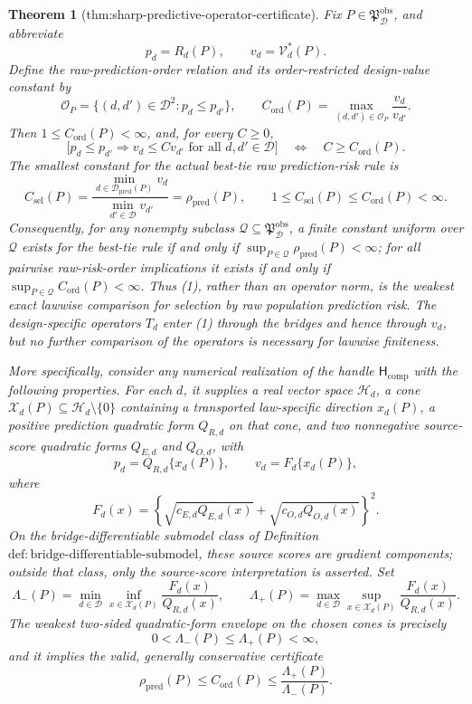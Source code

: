 \documentclass{article}
\newtheorem{theorem}{Theorem}
\begin{document}
\begin{theorem}[thm:sharp-predictive-operator-certificate]\label{thm:sharp-predictive-operator-certificate}
Fix \(P\in\mathfrak P_{\mathcal D}^{\mathrm{obs}}\), and abbreviate
\[
 p_d=R_d(P),
 \qquad v_d=\mathcal V_d^*(P).
\]
Define the raw-prediction-order relation and its order-restricted design-value constant by
\[
 \mathcal O_P=\{(d,d')\in\mathcal D^2:p_d\le p_{d'}\},
 \qquad
 C_{\mathrm{ord}}(P)=\max_{(d,d')\in\mathcal O_P}\frac{v_d}{v_{d'}}. \tag{1}
\]
Then \(1\le C_{\mathrm{ord}}(P)<\infty\), and, for every \(C\ge0\),
\[
 \bigl[p_d\le p_{d'}\Longrightarrow v_d\le C v_{d'}
 \text{ for all }d,d'\in\mathcal D\bigr]
 \quad\Longleftrightarrow\quad C\ge C_{\mathrm{ord}}(P). \tag{2}
\]
The smallest constant for the actual best-tie raw prediction-risk rule is
\[
 C_{\mathrm{sel}}(P)
 =\frac{\min_{d\in\mathcal D_{\mathrm{pred}}(P)}v_d}
 {\min_{d'\in\mathcal D}v_{d'}}
 =\rho_{\mathrm{pred}}(P),
 \qquad
 1\le C_{\mathrm{sel}}(P)\le C_{\mathrm{ord}}(P)<\infty. \tag{3}
\]
Consequently, for any nonempty subclass \(\mathcal Q\subseteq\mathfrak P_{\mathcal D}^{\mathrm{obs}}\), a finite constant uniform over \(\mathcal Q\) exists for the best-tie rule if and only if \(\sup_{P\in\mathcal Q}\rho_{\mathrm{pred}}(P)<\infty\); for all pairwise raw-risk-order implications it exists if and only if \(\sup_{P\in\mathcal Q}C_{\mathrm{ord}}(P)<\infty\). Thus (1), rather than an operator norm, is the weakest exact lawwise comparison for selection by raw population prediction risk. The design-specific operators \(T_d\) enter (1) through the bridges and hence through \(v_d\), but no further comparison of the operators is necessary for lawwise finiteness.

More specifically, consider any numerical realization of the handle \(\mathsf H_{\mathrm{comp}}\) with the following properties. For each \(d\), it supplies a real vector space \(\mathcal H_d\), a cone \(\mathcal X_d(P)\subseteq\mathcal H_d\setminus\{0\}\) containing a transported law-specific direction \(x_d(P)\), a positive prediction quadratic form \(Q_{R,d}\) on that cone, and two nonnegative source-score quadratic forms \(Q_{E,d}\) and \(Q_{O,d}\), with
\[
 p_d=Q_{R,d}\{x_d(P)\},
 \qquad v_d=F_d\{x_d(P)\}, \tag{4}
\]
where
\[
 F_d(x)=\left\{\sqrt{c_{E,d}Q_{E,d}(x)}+\sqrt{c_{O,d}Q_{O,d}(x)}\right\}^2. \tag{5}
\]
On the bridge-differentiable submodel class of Definition~\(\mathrm{def{:}bridge\text{-}differentiable\text{-}submodel}\), these source scores are gradient components; outside that class, only the source-score interpretation is asserted. Set
\[
 \Lambda_-(P)=\min_{d\in\mathcal D}\inf_{x\in\mathcal X_d(P)}\frac{F_d(x)}{Q_{R,d}(x)},
 \qquad
 \Lambda_+(P)=\max_{d\in\mathcal D}\sup_{x\in\mathcal X_d(P)}\frac{F_d(x)}{Q_{R,d}(x)}. \tag{6}
\]
The weakest two-sided quadratic-form envelope on the chosen cones is precisely
\[
 0<\Lambda_-(P)\le\Lambda_+(P)<\infty, \tag{7}
\]
and it implies the valid, generally conservative certificate
\[
 \rho_{\mathrm{pred}}(P)\le C_{\mathrm{ord}}(P)\le\frac{\Lambda_+(P)}{\Lambda_-(P)}. \tag{8}
\]


\end{theorem}
\end{document}
